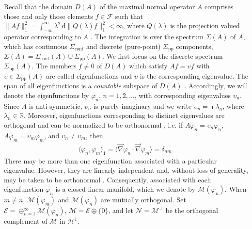 \documentclass[11pt]{amsart}
\renewcommand{\d}{\mathrm{d}}
\newcommand{\Sigc}{\Sigma_{\text{cont}}}
\newcommand{\Sigp}{\Sigma_{\text{pp}}}
\newcommand{\Hc}{\mathcal{H}}
\newcommand{\Fc}{\mathcal{F}}
\newcommand{\Ec}{\mathcal{E}}
\renewcommand{\Mc}{\mathcal{M}}
\newcommand{\Nc}{\mathcal{N}}
\begin{document}
Recall that the domain $D(A)$ of the maximal normal operator $A$
comprises those and only those elements $f\in\Fc$ such that
$\|Af\|_1^2=\int_{-\infty}^\infty\lambda^2\,\d\|Q(\lambda)f\|_1^2<\infty$, where $Q(\lambda)$ is the
projection valued operator corresponding to $A$ \cite{Stone:64}. The
integration is over the spectrum $\Sigma(A)$ of $A$, which has continuous
$\Sigc$ and discrete (pure-point) $\Sigp$ components,
$\Sigma(A)=\Sigc(A)\cup\Sigp(A)$. We first focus on the discrete spectrum
$\Sigp(A)$. The members $f\neq0$ of $D(A)$ which satisfy $Af=\upsilon f$ with
$\upsilon\in\Sigp(A)$ are called eigenfunctions and $\upsilon$ is the corresponding
eigenvalue. The span of all eigenfunctions is a \emph{countable}
subspace of $D(A)$ \cite{Reed-1980,Stone:64}. Accordingly, we will
denote the eigenfunctions by $\varphi_n$, $n=1,2,\ldots$, with corresponding
eigenvalues $\upsilon_n$. Since $A$ is anti-symmetric, $\upsilon_n$ is purely
imaginary \cite{Stone:64,Horn_Johnson-1990} and we write $\upsilon_n=\imath\lambda_n$,
where $\lambda_n\in\mathbb{R}$.  Moreover, eigenfunctions corresponding to
distinct eigenvalues are orthogonal and can be normalized to be
orthonormal \cite{Stone:64}, i.e. if $A\varphi_n=\upsilon_n\varphi_n$, $A\varphi_m=\upsilon_m\varphi_m$, and
$\upsilon_n\neq\upsilon_m$, then
%
\begin{align}\label{eq:Orthogonal}
  \langle\varphi_n,\varphi_m\rangle_1=\langle\vec{\nabla}\varphi_n\cdot\vec{\nabla}\varphi_m\rangle=\delta_{nm}.
\end{align}
%
There may be more than one
eigenfunction associated with a particular eigenvalue. However, they
are linearly independent and, without loss of generality, may be taken
to be orthonormal \cite{Stone:64}. Consequently, associated with each
eigenfunction $\varphi_n$ is a closed linear manifold, which we denote
by $\Mc(\varphi_n)$. When $m\neq n$, $\Mc(\varphi_m)$ and $\Mc(\varphi_n)$ are mutually
orthogonal. Set $\Ec=\oplus_{n=1}^\infty\Mc(\varphi_n)$, $\Mc=\Ec\oplus\{0\}$, and let
$\Nc=\Mc^\perp$ be the orthogonal complement of $\Mc$ in $\Hc^1$.  
\end{document}
